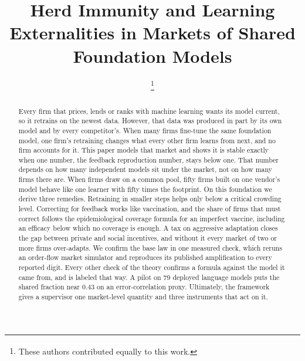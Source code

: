 \documentclass[conference]{IEEEtran}
\theoremstyle{definition}
\begin{document}
\title{Herd Immunity and Learning Externalities in Markets of Shared Foundation Models}

\author{
\and
{}
\thanks{\textsuperscript{\dag}These authors contributed equally to this work.}}


\maketitle

\begin{abstract}
Every firm that prices, lends or ranks with machine learning wants its model
current, so it retrains on the newest data. However, that data was produced in
part by its own model and by every competitor's. When many firms fine-tune the
same foundation model, one firm's retraining changes what every other firm
learns from next, and no firm accounts for it. This paper models that market
and shows it is stable exactly when one number, the feedback reproduction
number, stays below one. That number depends on how many independent models
sit under the market, not on how many firms there are. When firms draw on a
common pool, fifty firms built on one vendor's model behave like one learner
with fifty times the footprint. On this foundation we
derive three remedies. Retraining in smaller steps helps only below a critical
crowding level. Correcting for feedback works like vaccination, and the share
of firms that must correct follows the epidemiological coverage formula for an
imperfect vaccine, including an efficacy below which no coverage is enough. A
tax on aggressive adaptation closes the gap between private and social
incentives, and without it every market of two or more firms over-adapts. We
confirm the base law in one measured check, which reruns an order-flow market
simulator and reproduces its published amplification to every reported digit.
Every other check of the theory confirms a formula against the model it came
from, and is labeled that way. A pilot on 79 deployed language models puts the shared
fraction near 0.43 on an error-correlation proxy. Ultimately, the framework gives a supervisor one
market-level quantity and three instruments that act on it.
\end{abstract}
\end{document}

